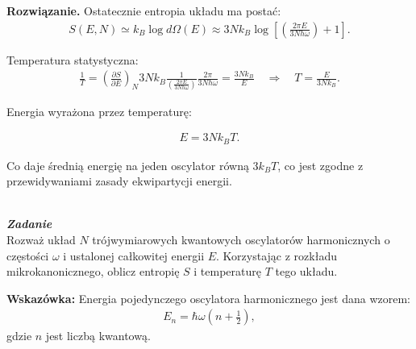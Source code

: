 \documentclass[11pt,a4paper]{article}
\newcounter{zadanie}\newcommand{\zadanie}[1][]{\addtocounter{zadanie}{1} ~\\  {\bf \emph{Zadanie \arabic{zadanie} #1 }} \\}
\newenvironment{solution}{\vspace{1cm} \par\textbf{Rozwiązanie.} \vspace{1cm}}{}
\begin{document}
\begin{solution}
Ostatecznie entropia układu ma postać:
\begin{align*}
S(E,N) \simeq k_B \log d\Omega(E) \approx 3N k_B \log \left[ \left( \frac{2\pi E}{3N h \omega}\right) + 1 \right].
\end{align*}

Temperatura statystyczna:
\begin{align*}
\frac{1}{T}=\left(\frac{\partial S}{\partial E}\right)_N
3Nk_B \frac{1}{\left( \frac{2\pi E}{3N h \omega} \right)} \frac{2\pi}{3N h \omega}
=\frac{3Nk_B}{E}
\quad\Longrightarrow\quad
T=\frac{E}{3Nk_B}.
\end{align*}

Energia wyrażona przez temperaturę:

\begin{align*}
E=3Nk_B T.
\end{align*}

Co daje średnią energię na jeden oscylator równą $3k_B T$, co jest zgodne 
z przewidywaniami zasady ekwipartycji energii.

\newpage
\end{solution}
\zadanie[]

Rozważ układ $N$ trójwymiarowych kwantowych oscylatorów harmonicznych o
częstości $\omega$ i ustalonej całkowitej energii $E$. 
Korzystając z rozkładu mikrokanonicznego, oblicz entropię $S$ i temperaturę $T$ 
tego układu.

{\bf Wskazówka:} Energia pojedynczego oscylatora harmonicznego jest dana wzorem:
\begin{align*}
E_n = \hbar \omega \left( n + \frac{1}{2} \right),
\end{align*}
gdzie $n$ jest liczbą kwantową.
\end{document}
